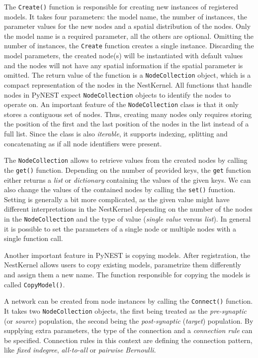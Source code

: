 The \texttt{Create()} function is responsible for creating new instances of registered models. It takes four parameters: the model name, the number of instances, the parameter values for the new nodes and a spatial distribution of the nodes. Only the model name is a required parameter, all the others are optional. Omitting the number of instances, the \texttt{Create} function creates a single instance. Discarding the model parameters, the created node(s) will be instantiated with default values and the nodes will not have any spatial information if the spatial parameter is omitted. The return value of the function is a \texttt{NodeCollection} object, which is a compact representation of the nodes in the NestKernel. All functions that handle nodes in PyNEST expect \texttt{NodeCollection} objects to identify the nodes to operate on. An important feature of the \texttt{NodeCollection} class is that it only stores a contiguous set of nodes. Thus, creating many nodes only requires storing the position of the first and the last position of the nodes in the list instead of a full list. Since the class is also \emph{iterable}, it supports indexing, splitting and concatenating as if all node identifiers were present.

The \texttt{NodeCollection} allows to retrieve values from the created nodes by calling the \texttt{get()} function. Depending on the number of provided keys, the \texttt{get} function either returns a \emph{list} or \emph{dictionary} containing the values of the given keys. We can also change the values of the contained nodes by calling the \texttt{set()} function. Setting is generally a bit more complicated, as the given value might have different interpretations in the NestKernel depending on the number of the nodes in the \texttt{NodeCollection} and the type of value (\emph{single value} versus \emph{list}). In general it is possible to set the parameters of a single node or multiple nodes with a single function call.

Another important feature in PyNEST is copying models. After registration, the NestKernel allows users to copy existing models, parametrize them differently and assign them a new name. The function responsible for copying the models is called \texttt{CopyModel()}.

A network can be created from node instances by calling the \texttt{Connect()} function. It takes two \texttt{NodeCollection} objects, the first being treated as the \emph{pre-synaptic} (or \emph{source}) population, the second being the \emph{post-synaptic} (\emph{target}) population. By supplying extra parameters, the type of the connection and a \emph{connection rule} can be specified. Connection rules in this context are defining the connection pattern, like \emph{fixed indegree}, \emph{all-to-all} or \emph{pairwise Bernoulli}.

